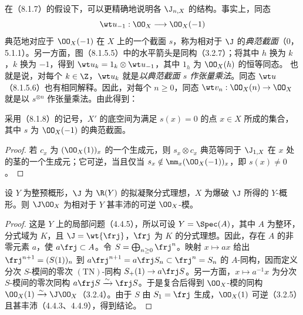 在（8.1.7）的假设下，可以更精确地说明各 $\J_{n,X}$ 的结构。事实上，同态
\[
\wt u_{-1}:\OO_X\longrightarrow\OO_X(-1)
\]
典范地对应于 $\OO_X(-1)$ 在 $X$ 上的一个截面 $s$，称为相对于 $\J$ 的\emph{典范截面}（0，5.1.1）。另一方面，图（8.1.5.5）中的水平箭头是同构（3.2.7）；将其中 $h$ 换为 $k$，$k$ 换为 $-1$，得到 $\wt u_k=1_k\otimes\wt u_{-1}$，其中 $1_h$ 为 $\OO_X(h)$ 的恒等同态。
也就是说，对每个 $k\in\Z$，$\wt u_k$ 就是\emph{以典范截面 $s$ 作张量乘法}。同态 $\wt u$（8.1.5.6）也有相同解释。因此，对每个 $n\geq0$，同态 $\wt v_n:\OO_X(n)\to\OO_X$ 就是以 $s^{\otimes n}$ 作张量乘法。由此得到：

采用（8.1.8）的记号，$X'$ 的底空间为满足 $s(x)=0$ 的点 $x\in X$ 所成的集合，其中 $s$ 为 $\OO_X(-1)$ 的典范截面。
\begin{proof}
若 $c_x$ 为 $(\OO_X(1))_x$ 的一个生成元，则 $s_x\otimes c_x$ 典范等同于 $\J_{1,X}$ 在 $x$ 处的茎的一个生成元；它可逆，当且仅当 $s_x\notin\mm_x(\OO_X(-1))_x$，即 $s(x)\ne0$。
\end{proof}

设 $Y$ 为整预概形，$\J$ 为 $\R(Y)$ 的拟凝聚分式理想，$X$ 为爆破 $\J$ 所得的 $Y$-概形。则 $\J\OO_X$ 为相对于 $Y$ 甚丰沛的可逆 $\OO_X$-模。
\begin{proof}
这是 $Y$ 上的局部问题（4.4.5），所以可设 $Y=\Spec(A)$，其中 $A$ 为整环，分式域为 $K$，且 $\J=\wt{\frj}$，$\frj$ 为 $K$ 的分式理想。因此，存在 $A$ 的非零元素 $a$，使 $a\frj\subset A$。令 $S=\bigoplus_{n\geq0}\frj^n$。映射 $x\mapsto ax$ 给出 $\frj^{n+1}=(S(1))_n$ 到 $a\frj^{n+1}=a\frj S_n\subset\frj^n=S_n$ 的 $A$-同构，因而定义分次 $S$-模间的零次 $(\mathrm{TN})$-同构 $S_+(1)\to a\frj S$。另一方面，$x\mapsto a^{-1}x$ 为分次 $S$-模间的零次同构 $a\frj S\xrightarrow{\sim}\frj S$。于是复合后得到 $\OO_X$-模的同构 $\OO_X(1)\xrightarrow{\sim}\J\OO_X$（3.2.4）。由于 $S$ 由 $S_1=\frj$ 生成，$\OO_X(1)$ 可逆（3.2.5）且甚丰沛（4.4.3、4.4.9），得到结论。
\end{proof}

